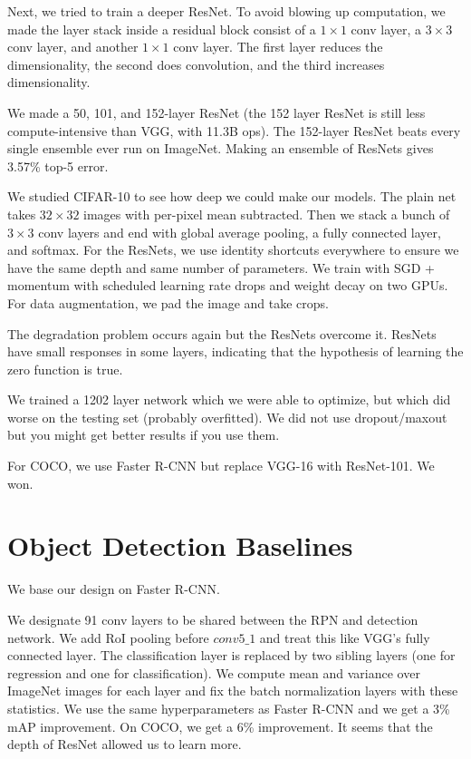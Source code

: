 \documentclass[a4paper]{article}
\begin{document}
Next, we tried to train a deeper ResNet. To avoid blowing up computation,
we made the layer stack inside a residual block consist of a $1 \times 1$
conv layer, a $3 \times 3$ conv layer, and another $1 \times 1$ conv layer.
The first layer reduces the dimensionality, the second does convolution, and
the third increases dimensionality.

We made a 50, 101, and 152-layer ResNet (the 152 layer ResNet is still less
compute-intensive than VGG, with 11.3B ops). The 152-layer ResNet beats
every single ensemble ever run on ImageNet. Making an ensemble of ResNets
gives 3.57\% top-5 error.

We studied CIFAR-10 to see how deep we could make our models. The plain net
takes $32 \times 32$ images with per-pixel mean subtracted. Then we stack
a bunch of $3 \times 3$ conv layers and end with global average pooling,
a fully connected layer, and softmax. For the ResNets, we use identity
shortcuts everywhere to ensure we have the same depth and same number of
parameters. We train with SGD + momentum with scheduled learning rate drops
and weight decay on two GPUs. For data augmentation, we pad the image and
take crops.

The degradation problem occurs again but the ResNets overcome it. ResNets have
small responses in some layers, indicating that the hypothesis of learning
the zero function is true.

We trained a 1202 layer network which we were able to optimize, but which did
worse on the testing set (probably overfitted). We did not use dropout/maxout
but you might get better results if you use them.

For COCO, we use Faster R-CNN but replace VGG-16 with ResNet-101. We won.

\section{Object Detection Baselines}
We base our design on Faster R-CNN.

We designate 91 conv layers to be shared between the RPN and detection network.
We add RoI pooling before $conv5\_1$ and treat this like VGG's fully connected
layer. The classification layer is replaced by two sibling layers (one for
regression and one for classification). We compute mean and variance over
ImageNet images for each layer and fix the batch normalization layers
with these statistics. We use the same hyperparameters as Faster R-CNN and we
get a 3\% mAP improvement. On COCO, we get a 6\% improvement. It seems that
the depth of ResNet allowed us to learn more.
\end{document}
